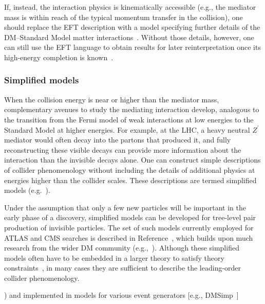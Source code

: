 \documentclass{ar-1col}
\newcommand{\IP}{invisible particle}
\newcommand{\Zprime}{\ensuremath{{Z}^\prime}\xspace}
\begin{document}
If, instead, the interaction physics is kinematically accessible
(e.g., the mediator mass is within reach of the typical momentum
transfer in the collision), one should replace the EFT description
with a model specifying further details of the DM--Standard Model matter
interactions~\cite{Shoemaker:2011vi}. Without those details,
however, one can still use the EFT language to obtain results for
later reinterpretation once its high-energy completion is known~\cite{Racco:2015dxa,Busoni:2013lha}.

\subsubsection{Simplified models}\label{sub:simplifiedModels}

When the collision energy is near or higher than the mediator
mass, complementary avenues to study the mediating interaction
develop, analogous to the transition from the Fermi model of weak
interactions at low energies to the Standard Model at higher
energies. For example, at the LHC, a heavy neutral \Zprime
mediator would often decay into the partons that produced it, and
fully reconstructing these visible decays can provide more
information about the interaction than the invisible decays alone.
One can construct simple descriptions of collider phenomenology without 
including the details of additional physics at energies higher than 
the collider scales. These descriptions are termed simplified models
(e.g.~). 

Under the assumption that only a few new particles
will be important in the early phase of a discovery, 
simplified models can be developed for tree-level pair production of {\IP}s. The set of such models
currently employed for ATLAS and CMS searches is described in
Reference~, which builds upon much research from
the wider DM community
(e.g.,~). Although these simplified
models often have to be embedded in a larger theory to satisfy theory
constraints~\cite{Kahlhoefer:2015bea}, in many cases they are sufficient to
describe the leading-order collider phenomenology.

\begin{marginnote}[]
)
and implemented in models for various event generators [e.g.,
DMSimp~\cite{Backovic:2015soa}]
\end{marginnote}
\end{document}
